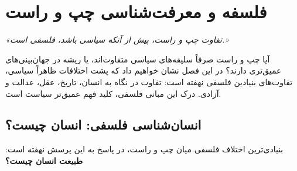 
\chapter{فلسفه و معرفت‌شناسی چپ و راست}
\label{ch:philosophy}

\begin{flushright}
	\textit{«تفاوت چپ و راست، پیش از آنکه سیاسی باشد، فلسفی است.»}
\end{flushright}
\vspace{-6pt}


\lettrine[lines=3, lraise=0.1, nindent=0.5em]{\textcolor{RightBlue}{آ}}{یا} 
چپ و راست صرفاً سلیقه‌های سیاسی متفاوت‌اند، یا ریشه در جهان‌بینی‌های عمیق‌تری دارند؟ در این فصل نشان خواهیم داد که پشت اختلافات ظاهراً سیاسی، تفاوت‌های بنیادین فلسفی نهفته است: تفاوت در نگاه به انسان، تاریخ، عقل، عدالت و آزادی. درک این مبانی فلسفی، کلید فهم عمیق‌تر سیاست است.

\section{انسان‌شناسی فلسفی: انسان چیست؟}

بنیادی‌ترین اختلاف فلسفی میان چپ و راست، در پاسخ به این پرسش نهفته است: \textbf{طبیعت انسان چیست؟}

